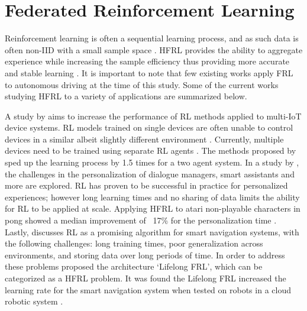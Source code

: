 \section{Federated Reinforcement Learning}

Reinforcement learning is often a sequential learning process, and as such data is often non-IID with a small sample space \cite{sutton2018reinforcement}.  HFRL provides the ability to aggregate experience while increasing the sample efficiency thus providing more accurate and stable learning  \cite{IntelAI19}. It is important to note that few existing works apply FRL to autonomous driving at the time of this study.  Some of the current works studying HFRL to a variety of applications are summarized below.

A study by \cite{Lim2020} aims to increase the performance of RL methods applied to multi-IoT device systems.  RL models trained on single devices are often unable to control devices in a similar albeit slightly different environment \cite{Lim2020}.  Currently, multiple devices need to be trained using separate RL agents \cite{Lim2020}. The methods proposed by \cite{Lim2020} sped up the learning process by 1.5 times for a two agent system. In a study by \cite{Nadiger2019}, the challenges in the personalization of dialogue managers, smart assistants and more are explored.  RL has proven to be successful in practice for personalized experiences; however long learning times and no sharing of data limits the ability for RL to be applied at scale.  Applying HFRL to atari non-playable characters in pong showed a median improvement of ~17\% for the personalization time \cite{Nadiger2019}. Lastly, \cite{Liu2019b} discusses RL as a promising algorithm for smart navigation systems, with the following challenges: long training times, poor generalization across environments, and storing data over long periods of time.  In order to address these problems \cite{Liu2019b} proposed the architecture `Lifelong FRL', which can be categorized as a HFRL problem.  It was found the Lifelong FRL increased the learning rate for the smart navigation system when tested on robots in a cloud robotic system \cite{Liu2019b}.  

